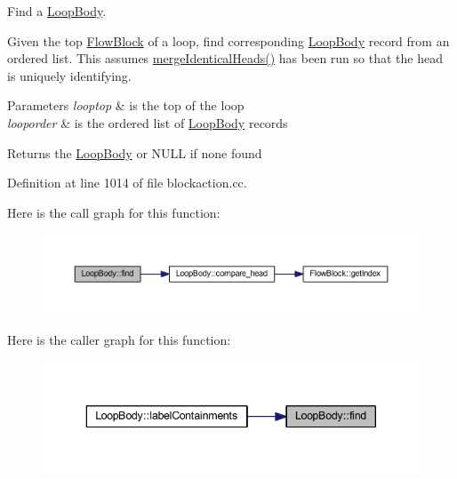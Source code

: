 Find a \mbox{\hyperlink{class_loop_body}{Loop\+Body}}. 

Given the top \mbox{\hyperlink{class_flow_block}{Flow\+Block}} of a loop, find corresponding \mbox{\hyperlink{class_loop_body}{Loop\+Body}} record from an ordered list. This assumes \mbox{\hyperlink{class_loop_body_a4f29c37ed94852f51302cbd3c0a9f85c}{merge\+Identical\+Heads()}} has been run so that the head is uniquely identifying. 
\begin{DoxyParams}{Parameters}
{\em looptop} & is the top of the loop \\
\hline
{\em looporder} & is the ordered list of \mbox{\hyperlink{class_loop_body}{Loop\+Body}} records \\
\hline
\end{DoxyParams}
\begin{DoxyReturn}{Returns}
the \mbox{\hyperlink{class_loop_body}{Loop\+Body}} or N\+U\+LL if none found 
\end{DoxyReturn}


Definition at line 1014 of file blockaction.\+cc.

Here is the call graph for this function\+:
\nopagebreak
\begin{figure}[H]
\begin{center}
\leavevmode
\includegraphics[width=350pt]{class_loop_body_a4fd224d75508dcfb4826877b99ad32ce_cgraph}
\end{center}
\end{figure}
Here is the caller graph for this function\+:
\nopagebreak
\begin{figure}[H]
\begin{center}
\leavevmode
\includegraphics[width=343pt]{class_loop_body_a4fd224d75508dcfb4826877b99ad32ce_icgraph}
\end{center}
\end{figure}
\mbox{\label{class_loop_body_aca6d8a4529165274b791ed9ec37385ef}} 

